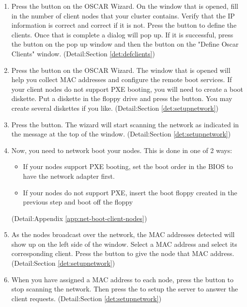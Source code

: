 \begin {enumerate}
\item Press the  button on the OSCAR Wizard. 
On the window that is opened, fill in the number of client nodes that your cluster
contains. Verify that the IP information is correct and correct if it is not.
Press the  button to define the clients. Once that is 
complete a dialog will pop up. 
If it is successful, press the  button on the pop up window 
and then the  button on the "Define Oscar Clients"
window. 
(Detail:Section \ref{det:defclients})

\item Press the  button on the OSCAR Wizard.
The window that is opened will help you collect MAC addresses and configure
the remote boot services. If your client nodes do not support PXE booting,
you will need to create a boot diskette. Put a diskette in the floppy
drive and press the  button. You may create 
several diskettes if you like.
(Detail:Section \ref{det:setupnetwork})

\item Press the  button. The wizard will start
scanning the network as indicated in the message at the top of the window. 
(Detail:Section \ref{det:setupnetwork})

\item Now, you need to network boot your nodes. This is done in one of 2 ways:

        \begin{itemize}
        \item If your nodes support PXE booting, set the boot order in the BIOS
        to have the network adapter first.
        \item If your nodes do not support PXE, insert the boot floppy created
        in the previous step and boot off the floppy
        \end{itemize}

(Detail:Appendix \ref{app:net-boot-client-nodes})

\item As the nodes broadcast over the network, the MAC addresses detected will show
up on the left side of the window. Select a MAC address and select its 
corresponding client. Press the  button to give the
node that MAC address. 
(Detail:Section \ref{det:setupnetwork})

\item When you have assigned a MAC address to each node, press the 
button to stop scanning the network. Then press the 
to setup the server to answer the client requests.
(Detail:Section \ref{det:setupnetwork})


\end{enumerate}
